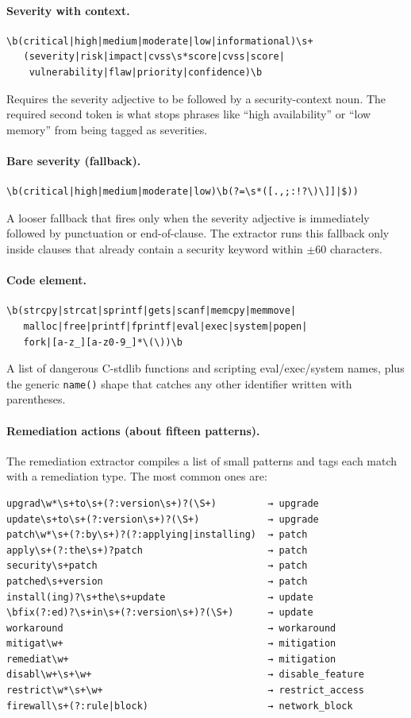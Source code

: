 \documentclass[11pt]{article}
\begin{document}
\paragraph{Severity with context.}
\begin{verbatim}
\b(critical|high|medium|moderate|low|informational)\s+
   (severity|risk|impact|cvss\s*score|cvss|score|
    vulnerability|flaw|priority|confidence)\b
\end{verbatim}
Requires the severity adjective to be followed by a security-context
noun. The required second token is what stops phrases like ``high
availability'' or ``low memory'' from being tagged as severities.

\paragraph{Bare severity (fallback).}
\begin{verbatim}
\b(critical|high|medium|moderate|low)\b(?=\s*([.,;:!?\)\]]|$))
\end{verbatim}
A looser fallback that fires only when the severity adjective is
immediately followed by punctuation or end-of-clause. The extractor
runs this fallback only inside clauses that already contain a security
keyword within $\pm 60$ characters.

\paragraph{Code element.}
\begin{verbatim}
\b(strcpy|strcat|sprintf|gets|scanf|memcpy|memmove|
   malloc|free|printf|fprintf|eval|exec|system|popen|
   fork|[a-z_][a-z0-9_]*\(\))\b
\end{verbatim}
A list of dangerous C-stdlib functions and scripting eval/exec/system
names, plus the generic \texttt{name()} shape that catches any other
identifier written with parentheses.

\paragraph{Remediation actions (about fifteen patterns).}
The remediation extractor compiles a list of small patterns and tags
each match with a remediation type. The most common ones are:
\begin{verbatim}
upgrad\w*\s+to\s+(?:version\s+)?(\S+)         → upgrade
update\s+to\s+(?:version\s+)?(\S+)            → upgrade
patch\w*\s+(?:by\s+)?(?:applying|installing)  → patch
apply\s+(?:the\s+)?patch                      → patch
security\s+patch                              → patch
patched\s+version                             → patch
install(ing)?\s+the\s+update                  → update
\bfix(?:ed)?\s+in\s+(?:version\s+)?(\S+)      → update
workaround                                    → workaround
mitigat\w+                                    → mitigation
remediat\w+                                   → mitigation
disabl\w+\s+\w+                               → disable_feature
restrict\w*\s+\w+                             → restrict_access
firewall\s+(?:rule|block)                     → network_block
\end{verbatim}
\end{document}
